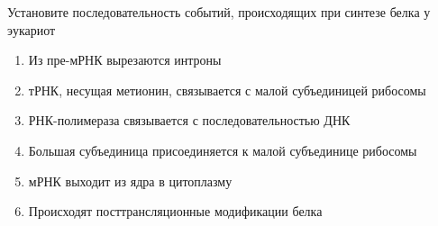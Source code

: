 
Установите последовательность событий, происходящих при синтезе белка у
эукариот

\begin{enumerate}
    \item Из пре-мРНК вырезаются интроны
    \item тРНК, несущая метионин, связывается с малой субъединицей рибосомы
    \item РНК-полимераза связывается с последовательностью ДНК
    \item Большая субъединица присоединяется к малой субъединице рибосомы
    \item мРНК выходит из ядра в цитоплазму
    \item Происходят посттрансляционные модификации белка
\end{enumerate}

